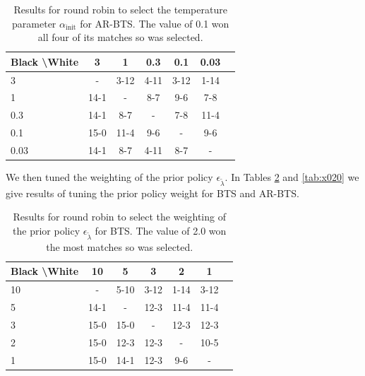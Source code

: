    \begin{table}[]
    \centering
        \begin{tabular}{l|cccccc}
            \textbf{Black \textbackslash White}     & 3  & 1   & 0.3   & 0.1    & 0.03    \\ 
            \hline
                                    3            & -     & 3-12  & 4-11  & 3-12  & 1-14  \\
                                    1             & 14-1  & -     & 8-7  & 9-6  & 7-8  \\
                                    0.3             & 14-1   & 8-7   &   -   & 7-8  & 11-4  \\
                                    0.1              & 15-0  & 11-4  & 9-6  & -     & 9-6  \\
                                    0.03              & 14-1  & 8-7  & 4-11  & 8-7  &   -   \\    
        \end{tabular}
        \caption{Results for round robin to select the temperature parameter $\alpha_{\text{init}}$ for AR-BTS. The value of 0.1 won all four of its matches so was selected. \label{tab:x001}}
    \end{table}
    
    
    
    
    
    
    We then tuned the weighting of the prior policy $\epsilon_{\tilde{\lambda}}$. In Tables \ref{tab:w020} and \ref{tab:x020} we give results of tuning the prior policy weight for BTS and AR-BTS.
    
    \begin{table}[]
    \centering
        \begin{tabular}{l|cccccc}
            \textbf{Black \textbackslash White}     & 10  & 5   & 3   & 2    & 1    \\ 
            \hline
                                    10            & - & 5-10 & 3-12 & 1-14 &  3-12  		\\
                                    5            & 14-1 & - & 12-3 & 11-4 & 11-4   		\\
                                    3          & 15-0 & 15-0 & - & 12-3 & 12-3   		\\
                                    2          & 15-0 & 12-3 & 12-3 & - & 10-5   		\\
                                    1         & 15-0 & 14-1 & 12-3 & 9-6 &   -   	\\    
        \end{tabular}
        \caption{Results for round robin to select the weighting of the prior policy $\epsilon_{\tilde{\lambda}}$ for BTS. The value of 2.0 won the most matches so was selected. \label{tab:w020}}
    \end{table}
    
